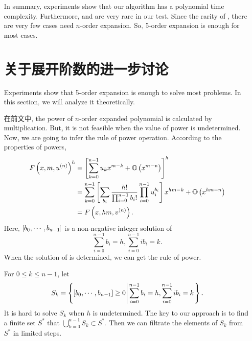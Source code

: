 In summary, experiments show that our algorithm has a polynomial time complexity. Furthermore, \BPtwo{} and \BPthree{} are very rare in our test. Since the rarity of \BPthree{}, there are very few cases need $n$-order expansion. So, 5-order expansion is enough for most cases.

\section{关于展开阶数的进一步讨论}

Experiments show that 5-order expansion is enough to solve most problems. In this section, we will analyze it theoretically.

在前文中, the power of $n$-order expanded polynomial is calculated by multiplication. But, it is not feasible when the value of power is undetermined. Now, we are going to infer the rule of power operation. According to the properties of powers,
\begin{equation}
\begin{split}
F\left(x,m,u^{(n)}\right)^h &= \left[\sum_{k=0}^{n-1}{u_kx^{m-k}}+\mathbb O\left(x^{m-n}\right)\right]^h \\
&= \sum_{k=0}^{n-1}{\left[\sum_{b_i}{\frac{h!}{\prod_{i=0}^{n-1}{b_i !}}\prod_{i=0}^{n-1}{u_i^{b_i}}}\right]x^{hm-k}}+\mathbb O\left(x^{hm-n}\right) \\
&= F\left(x,hm,v^{(n)}\right).
\end{split}
\label{power}
\end{equation}
Here, $\left[b_0,\cdots,b_{n-1}\right]$ is a non-negative integer solution of
\begin{equation}
\sum_{i=0}^{n-1}{b_i}=h,\sum_{i=0}^{n-1}{ib_i}=k \label{bi}.
\end{equation}
When the solution of  is determined, we can get the rule of power.

For $0\le k \le n-1$, let
\begin{equation}
S_k=\left\{\left[b_0,\cdots,b_{n-1}\right]\ge 0 \left| \sum_{i=0}^{n-1}{b_i}=h,\sum_{i=0}^{n-1}{ib_i}=k \right.\right\}.
\end{equation}
It is hard to solve $S_k$ when $h$ is undetermined. The key to our approach is to find a finite set $S^*$ that $\bigcup\nolimits_{k=0}^{n-1}S_k\subset S^*$. Then we can filtrate the elements of $S_k$ from $S^*$ in limited steps.

